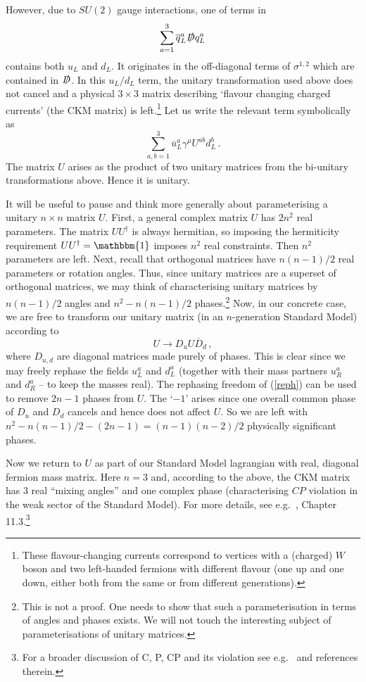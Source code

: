 \documentclass[12pt]{article}
\newcommand{\be}{\begin{equation}}
\newcommand{\ee}{\end{equation}}
\newcommand{\ol}{\overline}
\numberwithin{equation}{section}
\begin{document}
However, due to $SU(2)$ gauge interactions, one of terms in
\be
\sum_{a=1}^3\ol{q}_L^a\slashed D q_L^a
\ee
contains both $u_L$ and $d_L$. It originates in the off-diagonal terms of $\sigma^{1,2}$ which are contained in $\slashed{D}$. In this $u_L/d_L$ term, the unitary transformation used above does not cancel and a physical $3\!\times\! 3$ matrix describing `flavour changing charged currents' (the CKM matrix) is left.\footnote{
These flavour-changing currents correspond to vertices with a (charged) $W$ boson and two left-handed fermions with different flavour (one up and one down, either both from the same or from different generations). 
}
Let us write the relevant term symbolically as 
\be
\sum_{a,b=1}^3\ol{u}_L^a\gamma^\mu U^{ab}d_L^b\,.
\ee
The matrix $U$ arises as the product of two unitary matrices from the bi-unitary transformations above. Hence it is unitary.

It will be useful to pause and think more generally about parameterising a unitary \mbox{$n\times n$} matrix $U$. 
First, a general complex matrix $U$ has $2n^2$ real parameters. The matrix $UU^\dagger$ is always hermitian, 
so imposing the hermiticity requirement $UU^\dagger=\mathbbm{1}$ imposes $n^2$ real constraints. Then $n^2$ parameters are left. Next, recall that orthogonal matrices have $n(n-1)/2$ real parameters or rotation angles. Thus, since unitary matrices are a superset of orthogonal matrices, we may think of characterising unitary matrices by $n(n-1)/2$ angles and $n^2-n(n-1)/2$ phases.\footnote{This is not a proof. One needs to show that such a  parameterisation in terms of angles and phases exists. We will not touch the interesting subject of parameterisations of unitary matrices.} Now, in our concrete case, we are free to transform our unitary matrix (in an $n$-generation
Standard Model) according to
\be
U\to D_u U \ol{D}_d\,,\label{reph}
\ee
where $D_{u,d}$ are diagonal matrices made purely of phases. This is clear since we may freely rephase the fields $u_L^a$ and $d_L^a$ (together with their mass partners  $u_R^a$ and $d_R^a$ -- to keep the masses real). The rephasing freedom of (\ref{reph}) can be used to remove $2n-1$ phases from $U$. The `$-1$' arises since one overall common phase of $D_u$ and $D_d$ cancels and hence does not affect $U$. So we are left with $n^2-n(n-1)/2-(2n-1)=(n-1)(n-2)/2$ physically significant phases.

Now we return to $U$ as part of our Standard Model lagrangian with real, diagonal fermion mass matrix. Here $n=3$ and, according to the above, the CKM matrix has 3 real ``mixing angles'' and one complex phase (characterising $CP$  violation in the weak sector of the Standard Model). For more details, see e.g.~\cite{Cheng:1985bj}, Chapter 11.3.\footnote{
For a broader discussion of C, P, CP and its violation see e.g.~\cite{Blanke:2017ohr, Grinstein:2017pvg, kt, Bigi:2000yz, Fleischer:2006fx, Branco:1999fs} and references therein.
}
\end{document}
